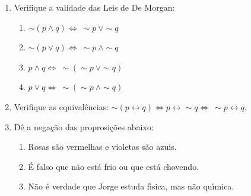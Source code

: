 \documentclass[a4paper,5pt]{amsbook}
\newcommand{\lra}{\leftrightarrow}
\newcommand{\LRa}{\Leftrightarrow}
\renewcommand{\lnot}{\sim}
\begin{document}
\vspace{1cm}
\begin{enumerate}
    \vspace{0.5cm}
    \item Verifique a validade das Leis de De Morgan:
        \begin{enumerate}
            \item $\lnot (p\land q) \LRa \ \lnot p\ \lor \lnot q$
            \item $\lnot (p\lor q) \LRa \ \lnot p\ \land \lnot q$
            \item $p\land q \LRa \ \lnot( \lnot p\ \lor \lnot q)$
            \item $p\lor q \LRa \ \lnot(\lnot p\ \land \lnot q)$
        \end{enumerate} 

    \vspace{0.5cm}
    \item Verifique as equival\^encias: $\lnot (p\lra q) \LRa p \lra \lnot q \LRa
    \ \lnot p \lra q$.

    \vspace{0.5cm}
    \item D\^e a nega\c{c}\~ao das proprosi\c{c}\~oes abaixo:
        \begin{enumerate}
            \item Rosas s\~ao vermelhas e violetas s\~ao azuis.
            \item \'E falso que n\~ao est\'a frio ou que est\'a chovendo.
            \item N\~ao \'e verdade que Jorge estuda f\'{\i}sica, mas n\~ao qu\'{\i}mica.
        \end{enumerate}
\end{enumerate}
\end{document}
